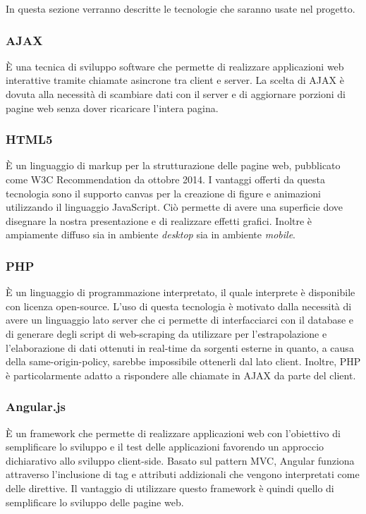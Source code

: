 In questa sezione verranno descritte le tecnologie che saranno usate nel progetto.


\subsubsection{AJAX}
È una tecnica di sviluppo software che permette di realizzare applicazioni web interattive tramite chiamate asincrone tra client e server.
La scelta di AJAX è dovuta alla necessità di scambiare dati con il server e di aggiornare porzioni di pagine web senza dover ricaricare l'intera pagina.

\subsubsection{HTML5}
È un linguaggio di markup per la strutturazione delle pagine web, pubblicato come W3C Recommendation da ottobre 2014.
I vantaggi offerti da questa tecnologia sono il supporto canvas per la creazione di figure e animazioni utilizzando il linguaggio JavaScript. Ciò permette di avere una superficie dove disegnare la nostra presentazione e di realizzare effetti grafici. Inoltre è ampiamente diffuso sia in ambiente \textit{desktop} sia in ambiente \textit{mobile}.

\subsubsection{PHP}
È un linguaggio di programmazione interpretato, il quale interprete è disponibile con licenza open-source.
L'uso di questa tecnologia è motivato dalla necessità di avere un linguaggio lato server che ci permette di interfacciarci con il database e di generare degli script di web-scraping da utilizzare per l'estrapolazione e l'elaborazione di dati ottenuti in real-time da sorgenti esterne in quanto, a causa della same-origin-policy, sarebbe impossibile ottenerli dal lato client. Inoltre, PHP è particolarmente adatto a rispondere alle chiamate in AJAX da parte del client.

\subsubsection{Angular.js}
È un framework che permette di realizzare applicazioni web con l'obiettivo di semplificare lo sviluppo e il test delle applicazioni favorendo un approccio dichiarativo allo sviluppo client-side. Basato sul pattern MVC, Angular funziona attraverso l'inclusione di tag e attributi addizionali che vengono interpretati come delle direttive.
Il vantaggio di utilizzare questo framework è quindi quello di semplificare lo sviluppo delle pagine web.

